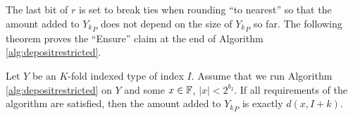       The last bit of $r$ is set to break ties when rounding ``to nearest'' so that the amount added to ${Y_k}_P$ does not depend on the size of ${Y_k}_P$ so far. The following theorem proves the ``Ensure'' claim at the end of Algorithm \ref{alg:depositrestricted}.

    \begin{samepage}
      \begin{thm}
        Let $Y$ be an $K$-fold indexed type of index $I$. Assume that we run Algorithm \ref{alg:depositrestricted} on $Y$ and some $x \in \mathbb{F}$, $|x| < 2^{b_I}$. If all requirements of the algorithm are satisfied, then the amount added to ${Y_k}_P$ is exactly $d(x, I + k)$.
        \label{thm:ddepositrestricted}
      \end{thm}
    \end{samepage}

